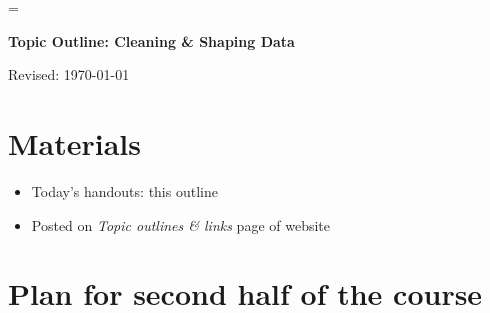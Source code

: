\documentclass[11pt]{article}
\begin{document}
\parskip=\bigskipamount
\parindent=0.0in
\thispagestyle{empty}


\bigskip\bigskip
\centerline{\Large \bf Topic Outline:  Cleaning \& Shaping Data}
\centerline{Revised: \today}

\section*{Materials}

\begin{itemize}
\item  Today's handouts:  this outline 
\item  Posted on {\it Topic outlines \& links\/} page of website
\end{itemize}


\section*{Plan for second half of the course}
\end{document}
